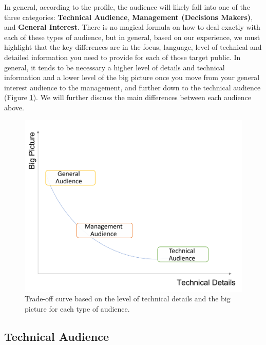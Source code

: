 \documentclass[
]{krantz}
\begin{document}
In general, according to the profile, the audience will likely fall into one of the three categories: \textbf{Technical Audience}, \textbf{Management (Decisions Makers)}, and \textbf{General Interest}. There is no magical formula on how to deal exactly with each of these types of audience, but in general, based on our experience, we must highlight that the key differences are in the focus, language, level of technical and detailed information you need to provide for each of those target public. In general, it tends to be necessary a higher level of details and technical information and a lower level of the big picture once you move from your general interest audience to the management, and further down to the technical audience (Figure \ref{fig:trade-off}). We will further discuss the main differences between each audience above.

\begin{figure}
\includegraphics[width=0.9\linewidth]{images/trade-off_value_delivery} \caption{Trade-off curve based on the level of technical details and the big picture for each type of audience.}\label{fig:trade-off}
\end{figure}

\hypertarget{technical-audience}{%
\subsection{Technical Audience}\label{technical-audience}}
\end{document}
